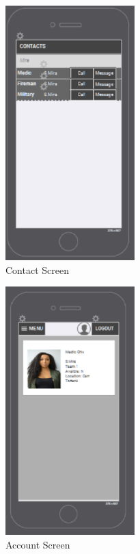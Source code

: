 \begin{figure}[htbp]
\begin{center}
 \caption{\label{fig:A5} Contact Screen}
   \includegraphics[width=50mm]{./images/App/contactscreen.eps}
\end{center}
\end{figure}
\begin{figure}[htbp]
\begin{center}
 \caption{\label{fig:A11} Account Screen}
   \includegraphics[width=50mm]{./images/App/accountscreen.eps}
\end{center}
\end{figure}
